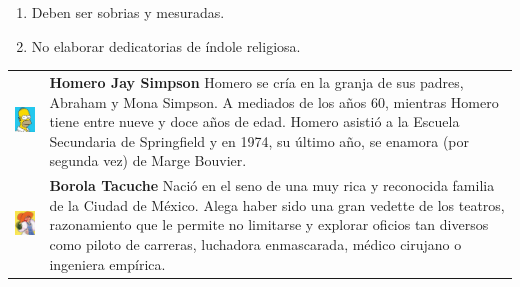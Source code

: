 \documentclass[fleqn,10pt]{AmateCodex} %
\begin{document}
\begin{enumerate}[noitemsep]
 \item Deben ser sobrias y mesuradas.
 \item No elaborar dedicatorias de índole religiosa.
\end{enumerate}




\begin{center}
\begin{tabular}{m{4cm} m{4cm}}
\includegraphics{foto_autor/homero_simpson.jpg} & \textbf{Homero Jay Simpson} Homero se cría en la granja de sus padres, Abraham y Mona Simpson. A mediados de los años 60, mientras Homero tiene entre nueve y doce años de edad. Homero asistió a la Escuela Secundaria de Springfield y en 1974, su último año, se enamora (por segunda vez) de Marge Bouvier. \\
\includegraphics{foto_autor/borola-burron2.png} & \textbf{Borola Tacuche} Nació en el seno de una muy rica y reconocida familia de la Ciudad de México. Alega haber sido una gran vedette de los teatros, razonamiento que le permite no limitarse y explorar oficios tan diversos como piloto de carreras, luchadora enmascarada, médico cirujano o ingeniera empírica.
\end{tabular}
\end{center}
\end{document}
